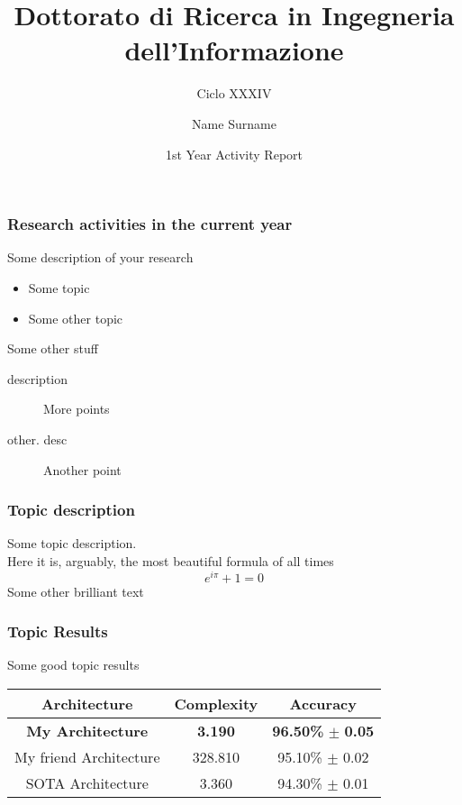 \documentclass{beamer}
\title{Dottorato di Ricerca in Ingegneria dell'Informazione}
\subtitle{Ciclo XXXIV}
\date{1st Year Activity Report}
\author{Name Surname}
\begin{document}
\begin{frame}[plain]
    \titlepage
\end{frame}


\begin{frame}
    \frametitle{Research activities in the current year}
    Some description of your research
    \hfill \\
    \begin{itemize}
        \item Some topic
        \item Some other topic
    \end{itemize}
    \vfill
    Some other stuff
    \begin{description}
        \item[description] More points
        \item[other. desc] Another point 
    \end{description}
\end{frame}

\begin{frame}
    \frametitle{Topic description}
    Some topic description.\\
    Here it is, arguably, the most beautiful formula of all times
    $$
    e^{i\pi} + 1 = 0
    $$
    Some other brilliant text
\end{frame}


\begin{frame}
    \frametitle{Topic Results}
    Some good topic results
    \vfill
    \begin{table}[]
        \begin{tabular}{ccc}
        \hline
        Architecture & Complexity & Accuracy \\ \hline 
        \textbf{My Architecture} & \textbf{3.190} & \textbf{96.50\%} $\mathbf{\pm}$ \textbf{0.05} \\   
        My friend Architecture & 328.810 & 95.10\% $\pm$ 0.02 \\ 
        SOTA Architecture & 3.360 & 94.30\% $\pm$ 0.01 \\ 
        \end{tabular}
        \end{table}
\end{frame}
\end{document}
